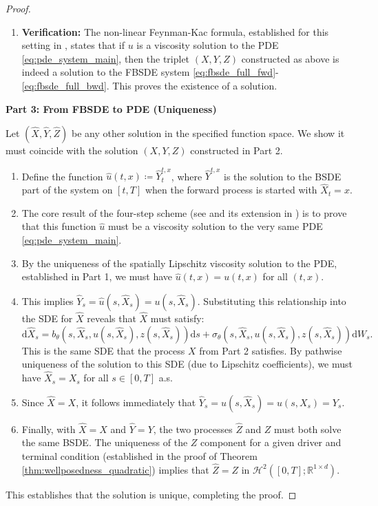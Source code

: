 \documentclass[qian]{imsart}
\newcommand{\R}{\mathbb{R}}
\newcommand{\dd}{\mathrm{d}}
\theoremstyle{plain}
\theoremstyle{definition}
\begin{document}
\begin{proof}
\begin{enumerate}
    \item \textbf{Verification:} The non-linear Feynman-Kac formula, established for this setting in \cite{Delarue2002}, states that if $u$ is a viscosity solution to the PDE \eqref{eq:pde_system_main}, then the triplet $(X,Y,Z)$ constructed as above is indeed a solution to the FBSDE system \eqref{eq:fbsde_full_fwd}-\eqref{eq:fbsde_full_bwd}. This proves the existence of a solution.
\end{enumerate}

\textbf{Part 3: From FBSDE to PDE (Uniqueness)}

Let $(\hat{X}, \hat{Y}, \hat{Z})$ be any other solution in the specified function space. We show it must coincide with the solution $(X,Y,Z)$ constructed in Part 2.
\begin{enumerate}
    \item Define the function $\hat{u}(t,x) \coloneqq \hat{Y}_t^{t,x}$, where $\hat{Y}^{t,x}$ is the solution to the BSDE part of the system on $[t,T]$ when the forward process is started with $\hat{X}_t=x$.
    
    \item The core result of the four-step scheme (see \cite{MaProtterYong1994} and its extension in \cite{Delarue2002}) is to prove that this function $\hat{u}$ must be a viscosity solution to the very same PDE \eqref{eq:pde_system_main}.
    
    \item By the uniqueness of the spatially Lipschitz viscosity solution to the PDE, established in Part 1, we must have $\hat{u}(t,x) = u(t,x)$ for all $(t,x)$.
    
    \item This implies $\hat{Y}_s = \hat{u}(s, \hat{X}_s) = u(s, \hat{X}_s)$. Substituting this relationship into the SDE for $\hat{X}$ reveals that $\hat{X}$ must satisfy:
    \[ \dd \hat{X}_s = b_\theta(s, \hat{X}_s, u(s,\hat{X}_s), z(s,\hat{X}_s)) \dd s + \sigma_\theta(s, \hat{X}_s, u(s,\hat{X}_s), z(s,\hat{X}_s)) \dd W_s. \]
    This is the same SDE that the process $X$ from Part 2 satisfies. By pathwise uniqueness of the solution to this SDE (due to Lipschitz coefficients), we must have $\hat{X}_s = X_s$ for all $s \in [0,T]$ a.s.
    
    \item Since $\hat{X}=X$, it follows immediately that $\hat{Y}_s = u(s,\hat{X}_s) = u(s,X_s) = Y_s$.
    
    \item Finally, with $\hat{X}=X$ and $\hat{Y}=Y$, the two processes $\hat{Z}$ and $Z$ must both solve the same BSDE. The uniqueness of the $Z$ component for a given driver and terminal condition (established in the proof of Theorem \ref{thm:wellposedness_quadratic}) implies that $\hat{Z} = Z$ in $\mathcal{H}^2([0,T];\R^{1 \times d})$.
\end{enumerate}
This establishes that the solution is unique, completing the proof.
\end{proof}
\end{document}
